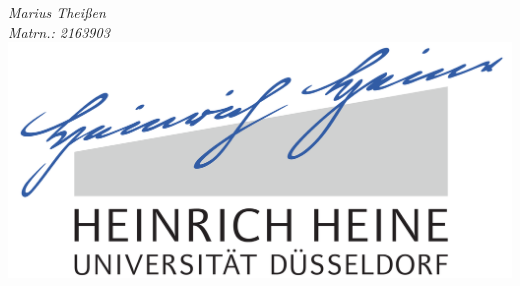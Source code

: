 \documentclass[
12pt, %
english, %
singlespacing, %
headsepline, %
]{MastersDoctoralThesis} %
\author{John \textsc{Smith}} %
\begin{document}
\frontmatter %

\pagestyle{plain} %


\begin{titlepage}
\begin{center}

\vspace*{.06\textheight}
{\scshape\LARGE \univname\par}\vspace{1.5cm} %

\HRule \\[0.4cm] %
{\huge \bfseries \ttitle\par}\vspace{0.4cm} %
\HRule \\[1.5cm] %
 
{\Large \textit{Marius Thei\ss{}en \\ Matrn.: 2163903}}\\[0.5cm] 
% 
% 
\vfill
\includegraphics[scale=0.11]{logo} %


\end{center}
\end{titlepage}
\end{document}
